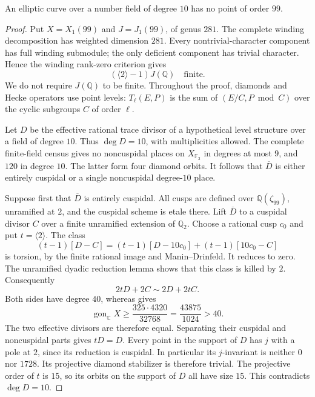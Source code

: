 \begin{proposition}\label{prop:decic-no99}
An elliptic curve over a number field of degree $10$ has no point
of order $99$.
\end{proposition}
\begin{proof}
Put $X=X_1(99)$ and $J=J_1(99)$, of genus $281$.
The complete winding decomposition has weighted dimension $281$.
Every nontrivial-character component has full winding submodule;
the only deficient component has trivial character. Hence the
winding rank-zero criterion gives
\[
                 (\langle2\rangle-1)J(\mathbb Q)\quad\text{finite}.
\]
We do not require $J(\mathbb Q)$ to be finite.
Throughout the proof, diamonds and Hecke operators use point levels:
$T_\ell(E,P)$ is the sum of $(E/C,P\bmod C)$ over the cyclic
subgroups $C$ of order $\ell$.

Let $D$ be the effective rational trace divisor of a hypothetical
level structure over a field of degree $10$. Thus $\deg D=10$,
with multiplicities allowed. The complete finite-field census gives
no noncuspidal places on $X_{\mathbb F_2}$ in degrees at most $9$,
and $120$ in degree $10$. The latter form four diamond orbits.
It follows that $\overline D$ is either entirely cuspidal or a
single noncuspidal degree-$10$ place.

Suppose first that $\overline D$ is entirely cuspidal.
All cusps are defined over $\mathbb Q(\zeta_{99})$, unramified at
$2$, and the cuspidal scheme is etale there. Lift $\overline D$ to
a cuspidal divisor $C$ over a finite unramified extension of
$\mathbb Q_2$. Choose a rational cusp $c_0$ and put
$t=\langle2\rangle$. The class
\[
 (t-1)[D-C]=(t-1)[D-10c_0]+(t-1)[10c_0-C]
\]
is torsion, by the finite rational image and Manin--Drinfeld.
It reduces to zero. The unramified dyadic reduction lemma
\cite[Section~6.2]{DN} shows that this class is killed by $2$.
Consequently
\[
                     2tD+2C\sim2D+2tC.
\]
Both sides have degree $40$, whereas \cite[(2.1)]{NV} gives
\[
 \operatorname{gon}_{\mathbb C}X\geq
 \frac{325\cdot4320}{32768}=\frac{43875}{1024}>40.
\]
The two effective divisors are therefore equal. Separating their
cuspidal and noncuspidal parts gives $tD=D$.
Every point in the support of $D$ has $j$ with a pole at $2$,
since its reduction is cuspidal. In particular its $j$-invariant
is neither $0$ nor $1728$. Its projective diamond stabilizer is
therefore trivial. The projective order of $t$ is $15$, so its
orbits on the support of $D$ all have size $15$. This contradicts
$\deg D=10$.


\end{proof}
